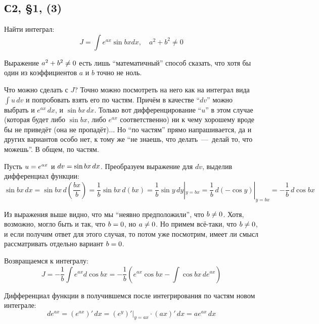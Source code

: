 \documentclass[a4paper,12pt]{article}
\begin{document}
  
  \subsection{С2, \S 1, (3)}
  
  Найти интеграл:
  \[
    J = \int e^{ax} \sin{bx} dx,\quad a^2 + b^2 \not= 0
  \]
  
  \begin{solution}
    Выражение $a^2 \hm+ b^2 \hm{\not=} 0$ есть лишь ``математичный'' способ сказать, что хотя бы один из коэффициентов $a$ и $b$ точно не ноль.
    
    Что можно сделать с $J$?
    Точно можно посмотреть на него как на интеграл вида $\int u\, dv$ и попробовать взять его по частям.
    Причём в качестве ``$dv$'' можно выбрать и $e^{ax}\, dx$, и $\sin{bx}\, dx$.
    Только вот дифференцирование ``$u$'' в этом случае (которая будет либо $\sin{bx}$, либо $e^{ax}$ соответственно) ни к чему хорошему вроде бы не приведёт (она не пропадёт)...
    Но ``по частям'' прямо напрашивается, да и других вариантов особо нет, к тому же ``не знаешь, что делать~---~делай то, что можешь''.
    В общем, по частям.
    
    Пусть $u \hm= e^{ax}$ и $dv \hm= \sin{bx}\, dx$.
    Преобразуем выражение для $dv$, выделив дифференциал функции:
    \begin{equation}\label{eq:2-1-24(3)-sinbxdx}
      \sin{bx}\, dx
        = \sin{bx}\, d\left(\frac{bx}{b}\right)
        = \frac{1}{b} \sin{bx}\, d(bx)
        = \frac{1}{b} \sin y\, dy|_{y = bx}
        = \frac{1}{b}\, d(-\cos y)|_{y = bx}
        = -\frac{1}{b}\, d\cos{bx}
    \end{equation}
    
    Из выражения выше видно, что мы ``неявно предположили'', что $b \hm{\not=} 0$.
    Хотя, возможно, могло быть и так, что $b \hm= 0$, но $a \hm{\not=} 0$.
    Но примем всё-таки, что $b \hm{\not=} 0$, и если получим ответ для этого случая, то потом уже посмотрим, имеет ли смысл рассматривать отдельно вариант $b \hm= 0$.

    Возвращаемся к интегралу:
    \[
      J = -\frac{1}{b} \int e^{ax} d\cos{bx}
        = -\frac{1}{b} \left(e^{ax} \cos{bx} - \int \cos{bx}\, de^{ax}\right)
    \]
    
    Дифференциал функции в получившемся после интегрирования по частям новом интеграле:
    \begin{equation}\label{eq:2-1-24(3)-deax}
      de^{ax} = \left(e^{ax}\right)'\, dx = (e^{y})'|_{y = ax} \cdot (ax)'\, dx = a e^{ax}\, dx
    \end{equation}
    

\end{solution}
\end{document}
